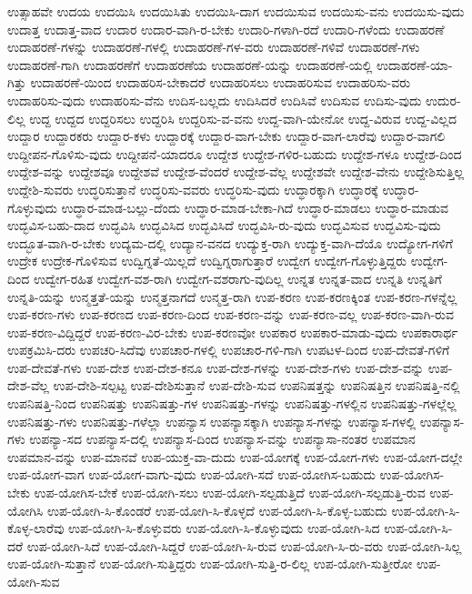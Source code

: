 {ಉತ್ಸಾಹವೇ
ಉದಯ
ಉದಯಿಸಿ
ಉದಯಿಸಿತು
ಉದಯಿಸಿ-ದಾಗ
ಉದಯಿಸುವ
ಉದಯಿಸು-ವನು
ಉದಯಿಸು-ವುದು
ಉದಾತ್ತ
ಉದಾತ್ತ-ವಾದ
ಉದಾರ
ಉದಾರ-ವಾಗಿ-ರ-ಬೇಕು
ಉದಾರಿ-ಗಳಾಗಿ-ರದೆ
ಉದಾರಿ-ಗಳೆಂದು
ಉದಾಹರಣೆ
ಉದಾಹರಣೆ-ಗಳನ್ನು
ಉದಾಹರಣೆ-ಗಳಲ್ಲಿ
ಉದಾಹರಣೆ-ಗಳ-ವರು
ಉದಾಹರಣೆ-ಗಳಿವೆ
ಉದಾಹರಣೆ-ಗಳು
ಉದಾಹರಣೆ-ಗಾಗಿ
ಉದಾಹರಣೆಗೆ
ಉದಾಹರಣೆಯ
ಉದಾಹರಣೆ-ಯನ್ನು
ಉದಾಹರಣೆ-ಯಲ್ಲಿ
ಉದಾಹರಣೆ-ಯಾ-ಗಿತ್ತು
ಉದಾಹರಣೆ-ಯಿಂದ
ಉದಾಹರಿಸ-ಬೇಕಾದರೆ
ಉದಾಹರಿಸಲು
ಉದಾಹರಿಸುವ
ಉದಾಹರಿಸು-ವರು
ಉದಾಹರಿಸು-ವುದು
ಉದಾಹರಿಸು-ವೆನು
ಉದಿಸ-ಬಲ್ಲದು
ಉದಿಸಿದರೆ
ಉದಿಸಿವೆ
ಉದಿಸುವ
ಉದಿಸು-ವುದು
ಉದುರ-ಲಿಲ್ಲ
ಉದ್ದ
ಉದ್ದದ
ಉದ್ದರಿಸಲು
ಉದ್ದರಿಸಿ
ಉದ್ದರಿಸು-ವ-ವನು
ಉದ್ದ-ವಾಗಿ-ಯೇನೋ
ಉದ್ದ-ವಿರುವ
ಉದ್ದ-ವಿಲ್ಲದ
ಉದ್ದಾರ
ಉದ್ದಾರಕರು
ಉದ್ದಾರ-ಕಳು
ಉದ್ದಾರಕ್ಕೆ
ಉದ್ದಾರ-ವಾಗ-ಬೇಕು
ಉದ್ದಾರ-ವಾಗ-ಲಾರೆವು
ಉದ್ದಾರ-ವಾಗಲಿ
ಉದ್ದೀಪನ-ಗೊಳಿಸು-ವುದು
ಉದ್ದೀಪನೆ-ಯಾದರೂ
ಉದ್ದೇಶ
ಉದ್ದೇಶ-ಗಳಿರ-ಬಹುದು
ಉದ್ದೇಶ-ಗಳೂ
ಉದ್ದೇಶ-ದಿಂದ
ಉದ್ದೇಶ-ವನ್ನು
ಉದ್ದೇಶವೂ
ಉದ್ದೇಶವೆ
ಉದ್ದೇಶ-ವೆಂದರೆ
ಉದ್ದೇಶ-ವೆಲ್ಲ
ಉದ್ದೇಶವೇ
ಉದ್ದೇಶ-ವೇನು
ಉದ್ದೇಶಿಸುತ್ತಿಲ್ಲ
ಉದ್ದೇಶಿ-ಸುವರು
ಉದ್ಧರಿಸುತ್ತಾನೆ
ಉದ್ಧರಿಸು-ವವರು
ಉದ್ಧರಿಸು-ವುದು
ಉದ್ಧಾರಕ್ಕಾಗಿ
ಉದ್ಧಾರಕ್ಕೆ
ಉದ್ಧಾರ-ಗೊಳ್ಳುವುದು
ಉದ್ಧಾರ-ಮಾಡ-ಬಲ್ಲು-ದೆಂದು
ಉದ್ಧಾರ-ಮಾಡ-ಬೇಕಾ-ಗಿದೆ
ಉದ್ಧಾರ-ಮಾಡಲು
ಉದ್ಧಾರ-ಮಾಡುವ
ಉದ್ಭವಿಸ-ಬಹು-ದಾದ
ಉದ್ಭವಿಸಿ
ಉದ್ಭವಿಸಿದ
ಉದ್ಭವಿಸಿದೆ
ಉದ್ಭವಿಸಿ-ರು-ವುದು
ಉದ್ಭವಿಸುವ
ಉದ್ಭವಿಸು-ವುದು
ಉದ್ಭೂತ-ವಾಗಿ-ರ-ಬೇಕು
ಉದ್ಯಮ-ದಲ್ಲಿ
ಉದ್ಯಾನ-ವನದ
ಉದ್ಯುಕ್ತ-ರಾಗಿ
ಉದ್ಯುಕ್ತ-ವಾಗಿ-ದೆಯೊ
ಉದ್ಯೋಗ-ಗಳಿಗೆ
ಉದ್ರೇಕ
ಉದ್ರೇಕ-ಗೊಳಿಸುವ
ಉದ್ವಿಗ್ನತೆ-ಯಿಲ್ಲದೆ
ಉದ್ವಿಗ್ನರಾಗುತ್ತಾರೆ
ಉದ್ವೇಗ
ಉದ್ವೇಗ-ಗೊಳ್ಳುತ್ತಿದ್ದರು
ಉದ್ವೇಗ-ದಿಂದ
ಉದ್ವೇಗ-ರಹಿತ
ಉದ್ವೇಗ-ವಶ-ರಾಗಿ
ಉದ್ವೇಗ-ವಶರಾಗು-ವುದಿಲ್ಲ
ಉನ್ನತ
ಉನ್ನತ-ವಾದ
ಉನ್ನತಿ
ಉನ್ನತಿಗೆ
ಉನ್ನತಿ-ಯನ್ನು
ಉನ್ಮತ್ತತೆ-ಯನ್ನು
ಉನ್ಮತ್ತನಾಗದೆ
ಉನ್ಮತ್ತ-ರಾಗಿ
ಉಪ-ಕರಣ
ಉಪ-ಕರಣಕ್ಕಿಂತ
ಉಪ-ಕರಣ-ಗಳನ್ನೆಲ್ಲ
ಉಪ-ಕರಣ-ಗಳು
ಉಪ-ಕರಣದ
ಉಪ-ಕರಣ-ದಿಂದ
ಉಪ-ಕರಣ-ವನ್ನು
ಉಪ-ಕರಣ-ವಲ್ಲ
ಉಪ-ಕರಣ-ವಾಗಿ-ರುವ
ಉಪ-ಕರಣ-ವಿದ್ದಿದ್ದರೆ
ಉಪ-ಕರಣ-ವಿರ-ಬೇಕು
ಉಪ-ಕರಣವೋ
ಉಪಕಾರ
ಉಪಕಾರ-ಮಾಡು-ವುದು
ಉಪಕಾರಾರ್ಥ
ಉಪಕ್ರಮಿಸಿ-ದರು
ಉಪಚರಿ-ಸಿದೆವು
ಉಪಚಾರ-ಗಳಲ್ಲಿ
ಉಪಚಾರ-ಗಳಿ-ಗಾಗಿ
ಉಪಟಳ-ದಿಂದ
ಉಪ-ದೇವತೆ-ಗಳಿಗೆ
ಉಪ-ದೇವತೆ-ಗಳು
ಉಪ-ದೇಶ
ಉಪ-ದೇಶ-ಕನೂ
ಉಪ-ದೇಶ-ಗಳನ್ನು
ಉಪ-ದೇಶ-ಗಳು
ಉಪ-ದೇಶ-ವನ್ನು
ಉಪ-ದೇಶ-ವೆಲ್ಲ
ಉಪ-ದೇಶಿ-ಸಲ್ಪಟ್ಟ
ಉಪ-ದೇಶಿಸುತ್ತಾನೆ
ಉಪ-ದೇಶಿ-ಸುವ
ಉಪನಿಷತ್ತನ್ನು
ಉಪನಿಷತ್ತಿನ
ಉಪನಿಷತ್ತಿ-ನಲ್ಲಿ
ಉಪನಿಷತ್ತಿ-ನಿಂದ
ಉಪನಿಷತ್ತು
ಉಪನಿಷತ್ತು-ಗಳ
ಉಪನಿಷತ್ತು-ಗಳನ್ನು
ಉಪನಿಷತ್ತು-ಗಳಲ್ಲಿನ
ಉಪನಿಷತ್ತು-ಗಳಲ್ಲೆಲ್ಲ
ಉಪನಿಷತ್ತು-ಗಳು
ಉಪನಿಷತ್ತು-ಗಳೆಲ್ಲಾ
ಉಪನ್ಯಾಸ
ಉಪನ್ಯಾಸಕ್ಕಾಗಿ
ಉಪನ್ಯಾಸ-ಗಳನ್ನು
ಉಪನ್ಯಾಸ-ಗಳಲ್ಲಿ
ಉಪನ್ಯಾಸ-ಗಳು
ಉಪನ್ಯಾ-ಸದ
ಉಪನ್ಯಾಸ-ದಲ್ಲಿ
ಉಪನ್ಯಾಸ-ದಿಂದ
ಉಪನ್ಯಾಸ-ವನ್ನು
ಉಪನ್ಯಾಸಾ-ನಂತರ
ಉಪಮಾನ
ಉಪಮಾನ-ವನ್ನು
ಉಪ-ಮಾನವೆ
ಉಪ-ಯುಕ್ತ-ವಾ-ದುದು
ಉಪ-ಯೋಗಕ್ಕೆ
ಉಪ-ಯೋಗ-ಗಳು
ಉಪ-ಯೋಗ-ದಲ್ಲೇ
ಉಪ-ಯೋಗ-ವಾಗ
ಉಪ-ಯೋಗ-ವಾಗು-ವುದು
ಉಪ-ಯೋಗಿ-ಸದೆ
ಉಪ-ಯೋಗಿಸ-ಬಹುದು
ಉಪ-ಯೋಗಿಸ-ಬೇಕು
ಉಪ-ಯೋಗಿಸ-ಬೇಕೆ
ಉಪ-ಯೋಗಿ-ಸಲು
ಉಪ-ಯೋಗಿ-ಸಲ್ಪಡುತ್ತಿದೆ
ಉಪ-ಯೋಗಿ-ಸಲ್ಪಡುತ್ತಿ-ರುವ
ಉಪ-ಯೋಗಿಸಿ
ಉಪ-ಯೋಗಿ-ಸಿ-ಕೊಂಡರೆ
ಉಪ-ಯೋಗಿ-ಸಿ-ಕೊಳ್ಳದೆ
ಉಪ-ಯೋಗಿ-ಸಿ-ಕೊಳ್ಳ-ಬಹುದು
ಉಪ-ಯೋಗಿ-ಸಿ-ಕೊಳ್ಳ-ಲಾರೆವು
ಉಪ-ಯೋಗಿ-ಸಿ-ಕೊಳ್ಳುವರು
ಉಪ-ಯೋಗಿ-ಸಿ-ಕೊಳ್ಳುವುದು
ಉಪ-ಯೋಗಿ-ಸಿದ
ಉಪ-ಯೋಗಿ-ಸಿ-ದರೆ
ಉಪ-ಯೋಗಿ-ಸಿದೆ
ಉಪ-ಯೋಗಿ-ಸಿದ್ದರೆ
ಉಪ-ಯೋಗಿ-ಸಿ-ರುವ
ಉಪ-ಯೋಗಿ-ಸಿ-ರು-ವರು
ಉಪ-ಯೋಗಿ-ಸಿಲ್ಲ
ಉಪ-ಯೋಗಿ-ಸುತ್ತಾನೆ
ಉಪ-ಯೋಗಿ-ಸುತ್ತಿದ್ದರು
ಉಪ-ಯೋಗಿ-ಸುತ್ತಿ-ರ-ಲಿಲ್ಲ
ಉಪ-ಯೋಗಿ-ಸುತ್ತೀರೋ
ಉಪ-ಯೋಗಿ-ಸುವ
}
